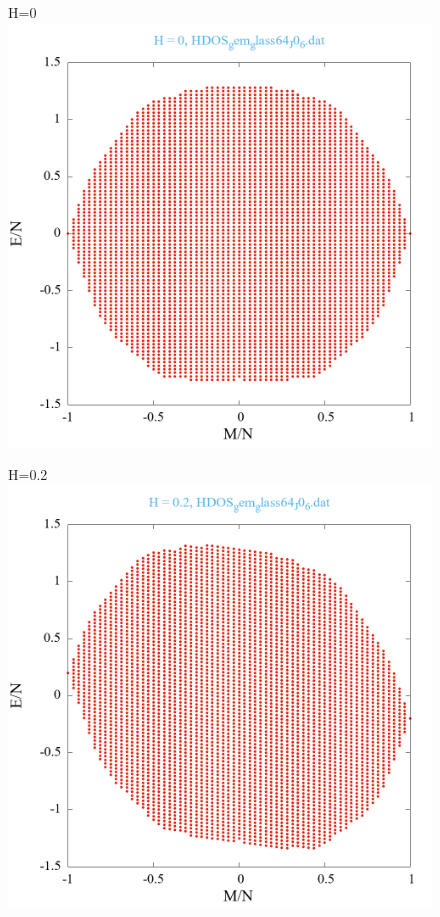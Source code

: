 \documentclass[utf8, babel, sor, jor, amsmath, amssymb, reprint]{elsarticle} %
\begin{document}
\begin{figure}[H]
	\begin{minipage}[h]{0.45\linewidth}
		\centering H=0
		\includegraphics[width=1\linewidth]{HDOS_gem_glass64_J0_6.dat_H0.png}
	\end{minipage}
	\hfill
	\begin{minipage}[h]{0.45\linewidth}
		\centering H=0.2
		\includegraphics[width=1\linewidth]{HDOS_gem_glass64_J0_6.dat_H0.2.png}

\end{minipage}
\end{figure}
\end{document}
